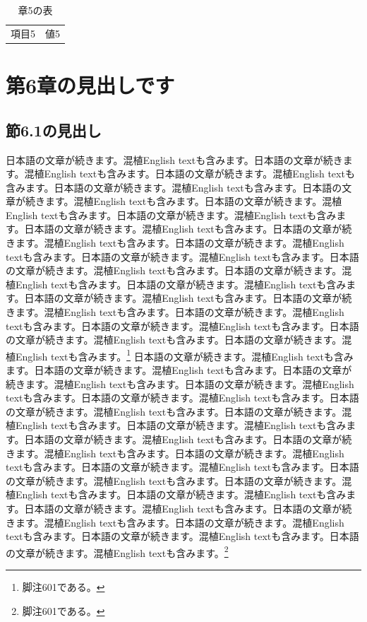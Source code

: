 \documentclass[pdflatex,book]{jlreq}
\begin{document}
\begin{table}[htbp]\centering\caption{章5の表}\begin{tabular}{cc}項目5 & 値5\\\end{tabular}\end{table}

\chapter{第6章の見出しです}
\section{節6.1の見出し}
日本語の文章が続きます。混植English textも含みます。日本語の文章が続きます。混植English textも含みます。日本語の文章が続きます。混植English textも含みます。日本語の文章が続きます。混植English textも含みます。日本語の文章が続きます。混植English textも含みます。日本語の文章が続きます。混植English textも含みます。日本語の文章が続きます。混植English textも含みます。日本語の文章が続きます。混植English textも含みます。日本語の文章が続きます。混植English textも含みます。日本語の文章が続きます。混植English textも含みます。日本語の文章が続きます。混植English textも含みます。日本語の文章が続きます。混植English textも含みます。日本語の文章が続きます。混植English textも含みます。日本語の文章が続きます。混植English textも含みます。日本語の文章が続きます。混植English textも含みます。日本語の文章が続きます。混植English textも含みます。日本語の文章が続きます。混植English textも含みます。日本語の文章が続きます。混植English textも含みます。日本語の文章が続きます。混植English textも含みます。日本語の文章が続きます。混植English textも含みます。\footnote{脚注601である。}
日本語の文章が続きます。混植English textも含みます。日本語の文章が続きます。混植English textも含みます。日本語の文章が続きます。混植English textも含みます。日本語の文章が続きます。混植English textも含みます。日本語の文章が続きます。混植English textも含みます。日本語の文章が続きます。混植English textも含みます。日本語の文章が続きます。混植English textも含みます。日本語の文章が続きます。混植English textも含みます。日本語の文章が続きます。混植English textも含みます。日本語の文章が続きます。混植English textも含みます。日本語の文章が続きます。混植English textも含みます。日本語の文章が続きます。混植English textも含みます。日本語の文章が続きます。混植English textも含みます。日本語の文章が続きます。混植English textも含みます。日本語の文章が続きます。混植English textも含みます。日本語の文章が続きます。混植English textも含みます。日本語の文章が続きます。混植English textも含みます。日本語の文章が続きます。混植English textも含みます。日本語の文章が続きます。混植English textも含みます。日本語の文章が続きます。混植English textも含みます。\footnote{脚注601である。}
\end{document}
